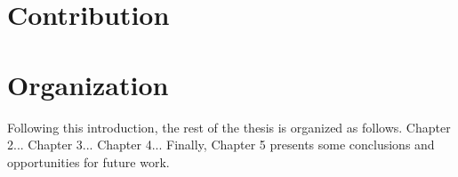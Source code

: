 \begin{doublespace}
\section{Contribution}


\section{Organization}

Following this introduction, the rest of the thesis is organized as follows.
Chapter 2...
Chapter 3...
Chapter 4...
Finally, Chapter 5 presents some conclusions and opportunities for future work.

\end{doublespace}